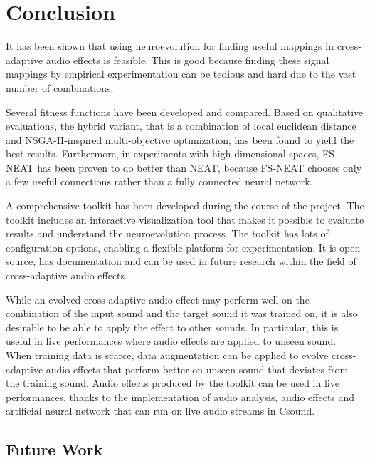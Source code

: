 \chapter{Conclusion}
\label{chapter:conclusion}

It has been shown that using neuroevolution for finding useful mappings in cross-adaptive audio effects is feasible. This is good because finding these signal mappings by empirical experimentation can be tedious and hard due to the vast number of combinations.

Several fitness functions have been developed and compared. Based on qualitative evaluations, the hybrid variant, that is a combination of local euclidean distance and NSGA-II-inspired multi-objective optimization, has been found to yield the best results. Furthermore, in experiments with high-dimensional spaces, FS-NEAT has been proven to do better than NEAT, because FS-NEAT chooses only a few useful connections rather than a fully connected neural network.

A comprehensive toolkit has been developed during the course of the project. The toolkit includes an interactive visualization tool that makes it possible to evaluate results and understand the neuroevolution process. The toolkit has lots of configuration options, enabling a flexible platform for experimentation. It is open source, has documentation and can be used in future research within the field of cross-adaptive audio effects.

While an evolved cross-adaptive audio effect may perform well on the combination of the input sound and the target sound it was trained on, it is also desirable to be able to apply the effect to other sounds. In particular, this is useful in live performances where audio effects are applied to unseen sound. When training data is scarce, data augmentation can be applied to evolve cross-adaptive audio effects that perform better on unseen sound that deviates from the training sound. Audio effects produced by the toolkit can be used in live performances, thanks to the implementation of audio analysis, audio effects and artificial neural network that can run on live audio streams in Csound.

\section{Future Work}

